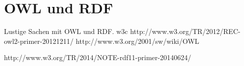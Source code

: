 \chapter{OWL und RDF}
\label{chap:owl_rdf}

Lustige Sachen mit OWL und RDF.
w3c
http://www.w3.org/TR/2012/REC-owl2-primer-20121211/
http://www.w3.org/2001/sw/wiki/OWL

http://www.w3.org/TR/2014/NOTE-rdf11-primer-20140624/


